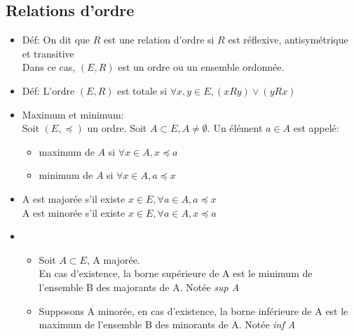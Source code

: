 \documentclass[fleqn]{article}
\begin{document}
\subsection{Relations d'ordre}
\begin{itemize}
	\item D\'ef: On dit que \(R\) est une relation d'ordre si \(R\) est r\'eflexive, antisym\'etrique et transitive \\
		Dans ce cas, \((E,R)\) est un ordre ou un ensemble ordonn\'ee.
	\item D\'ef: L'ordre \((E,R)\) est totale si \(\forall x,y \in E, (xRy) \lor (yRx)\)
	\item Maximum et minimum: \\
		Soit \((E, \preceq)\) un ordre. Soit \(A \subset E, A \neq \emptyset\). Un \'el\'ement \(a \in A\) est appel\'e:
		\begin{itemize}
			\item maximum de \(A\) si \(\forall x \in A, x \preceq a\)
			\item minimum de \(A\) si \(\forall x \in A, a \preceq x\)
		\end{itemize}
	\item A est major\'ee s'il existe \(x \in E, \forall a \in A, a \preceq x\) \\
		A est minor\'ee s'il existe \(x \in E, \forall a \in A, x \preceq a\)
	\item
		\begin{itemize}
			\item Soit \(A \subset E\), A major\'ee. \\
			En cas d'existence, la borne sup\'erieure de A est le minimum de l'ensemble B des majorants de A. Not\'ee \emph{sup A}
			\item Supposons A minor\'ee, en cas d'existence, la borne inf\'erieure de A est le maximum de l'ensemble B des minorants de A. Not\'ee \emph{inf A} \\
		\end{itemize}
\end{itemize}
\end{document}
